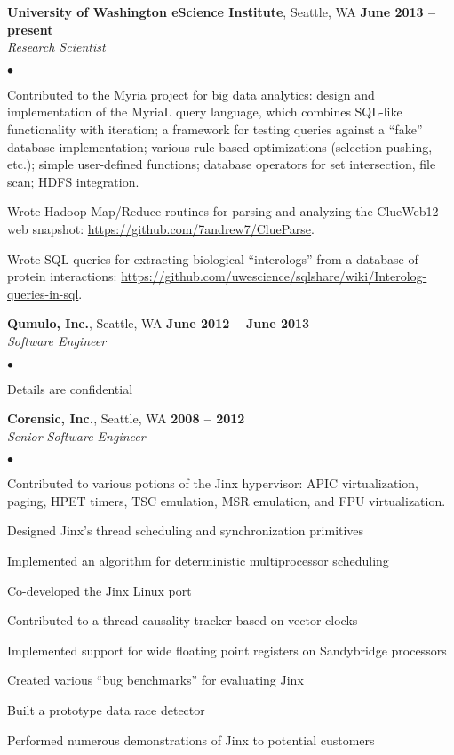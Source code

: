 \documentclass[margin,line]{res}
\newenvironment{list2}{
  \begin{list}{$\bullet$}{%
      \setlength{\itemsep}{0in}
      \setlength{\parsep}{0in} \setlength{\parskip}{0in}
      \setlength{\topsep}{0in} \setlength{\partopsep}{0in} 
      \setlength{\leftmargin}{0.2in}}}{\end{list}}
\begin{document}
\begin{resume}
\textbf{University of Washington eScience Institute}, Seattle, WA \hfill \textbf{June 2013 -- present} \\\vspace{-4mm}
\textsl{Research Scientist} \\
\begin{list2}
\item Contributed to the Myria project for big data analytics: design and implementation of the MyriaL query language, which combines SQL-like functionality with iteration; a framework for testing queries against a ``fake'' database implementation; various rule-based optimizations (selection pushing, etc.); simple user-defined functions; database operators for set intersection, file scan; HDFS integration.
\item Wrote Hadoop Map/Reduce routines for parsing and analyzing the ClueWeb12 web snapshot: 
\url{https://github.com/7andrew7/ClueParse}.
\item Wrote SQL queries for extracting biological ``interologs'' from a database of protein interactions:
\url{https://github.com/uwescience/sqlshare/wiki/Interolog-queries-in-sql}.
\end{list2}

\textbf{Qumulo, Inc.}, Seattle, WA \hfill \textbf{June 2012 -- June 2013} \\\vspace{-4mm}
\textsl{Software Engineer}  \\
\begin{list2}
  \item Details are confidential
  \end{list2}

\textbf{Corensic, Inc.}, Seattle, WA  \hfill \textbf{2008 -- 2012} \\\vspace{-4mm}
\textsl{Senior Software Engineer} \\
\begin{list2}
  \item Contributed to various potions of the Jinx hypervisor: APIC
    virtualization, paging,  HPET timers, TSC emulation, MSR emulation, and
    FPU virtualization.
  \item Designed Jinx's thread scheduling and synchronization primitives
  \item Implemented an algorithm for deterministic multiprocessor scheduling
  \item Co-developed the Jinx Linux port
  \item Contributed to a thread causality tracker based on vector clocks
  \item Implemented support for wide floating point registers on Sandybridge processors
  \item Created various ``bug benchmarks''  for evaluating Jinx
  \item Built a prototype data race detector
  \item Performed numerous demonstrations of Jinx to potential customers
\end{list2}


\end{resume}
\end{document}
